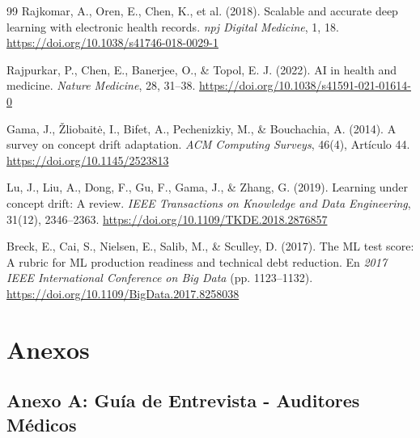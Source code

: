 \documentclass[12pt,letterpaper]{report}
\begin{document}
\begin{thebibliography}{99}
Rajkomar, A., Oren, E., Chen, K., et al. (2018). Scalable and accurate deep learning with electronic health records. \textit{npj Digital Medicine}, 1, 18. \url{https://doi.org/10.1038/s41746-018-0029-1}

Rajpurkar, P., Chen, E., Banerjee, O., \& Topol, E. J. (2022). AI in health and medicine. \textit{Nature Medicine}, 28, 31--38. \url{https://doi.org/10.1038/s41591-021-01614-0}

Gama, J., Žliobaitė, I., Bifet, A., Pechenizkiy, M., \& Bouchachia, A. (2014). A survey on concept drift adaptation. \textit{ACM Computing Surveys}, 46(4), Artículo 44. \url{https://doi.org/10.1145/2523813}

Lu, J., Liu, A., Dong, F., Gu, F., Gama, J., \& Zhang, G. (2019). Learning under concept drift: A review. \textit{IEEE Transactions on Knowledge and Data Engineering}, 31(12), 2346--2363. \url{https://doi.org/10.1109/TKDE.2018.2876857}

Breck, E., Cai, S., Nielsen, E., Salib, M., \& Sculley, D. (2017). The ML test score: A rubric for ML production readiness and technical debt reduction. En \textit{2017 IEEE International Conference on Big Data} (pp. 1123--1132). \url{https://doi.org/10.1109/BigData.2017.8258038}

\end{thebibliography}

\appendix
\chapter{Anexos}

\section{Anexo A: Guía de Entrevista - Auditores Médicos}
\end{document}
